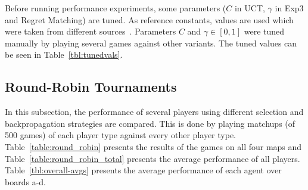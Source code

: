 \documentclass{article}
\begin{document}

Before running performance experiments, some parameters ($C$ in UCT, $\gamma$ in Exp3 and Regret Matching) are tuned. 
As reference constants, values are used which were taken from different sources~\cite{teuling_tron,cig_paper}. Parameters $C$ and 
$\gamma \in [0,1]$ were tuned manually by playing several games against other variants. 
The tuned values can be seen in Table~\ref{tbl:tunedvals}.

\subsection{Round-Robin Tournaments}
\label{subsec:round_robin}

In this subsection, the performance of several players using different selection and backpropagation strategies are compared. 
This is done by playing matchups (of 500 games) of each player type against every other player type. 
Table~\ref{table:round_robin} presents the results of the games on all four maps and Table~\ref{table:round_robin_total} presents the average
performance of all players.
Table~\ref{tbl:overall-avgs} presents the average performance of each agent over boards a-d. 
\end{document}
